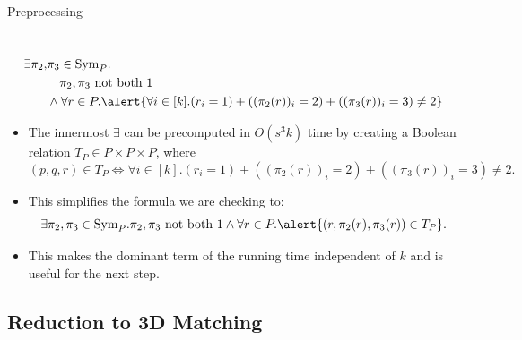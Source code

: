 \documentclass[t,10pt,
mathserif,xcolor=dvipsnames]{beamer}
\begin{document}
\begin{myframe}{Preprocessing}
  
  ~\\[-5ex]
  \begin{equation*}
    \begin{aligned}
      \exists \pi_2,&\pi_3 \in \Sym{P}.\\
      &~~~\pi_2, \pi_3 \text{ not both } 1\\
      &\wedge \forall r \in P. \alert{\forall i \in [k]. (r_i = 1) + ((\pi_2(r))_i = 2) + ((\pi_3(r))_i = 3) \neq 2}
    \end{aligned}
  \end{equation*}


  \begin{itemize}
  \item The innermost $\exists$ can be precomputed in $O(s^3k)$ time
    by creating a Boolean relation $T_P \in P \times P \times P$, where
    $$(p,q,r) \in T_P \Leftrightarrow \forall i \in [k]. (r_i = 1) + ((\pi_2(r))_i = 2) + ((\pi_3(r))_i = 3) \neq 2.$$

  \item This simplifies the formula we are checking to:
    $$\exists \pi_2,\pi_3 \in \Sym{P}. \pi_2, \pi_3 \text{ not both } 1 \wedge
    \forall r \in P. \alert{(r,\pi_2(r),\pi_3(r)) \in T_P}.$$
  \item This makes the dominant term of the running time independent
    of $k$ and is useful for the next step.
  \end{itemize}
  
\end{myframe}

\subsection{Reduction to 3D Matching}
\end{document}
